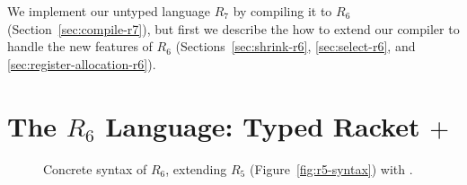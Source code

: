 \documentclass[11pt]{book}
\newcommand{\gray}[1]{{\color{gray} #1}}
\begin{document}
We implement our untyped language $R_7$ by compiling it to $R_6$
(Section~\ref{sec:compile-r7}), but first we describe the how to
extend our compiler to handle the new features of $R_6$
(Sections~\ref{sec:shrink-r6}, \ref{sec:select-r6}, and
\ref{sec:register-allocation-r6}).

\section{The $R_6$ Language: Typed Racket $+$ }
\label{sec:r6-lang}

\begin{figure}[tp]
\centering
\fbox{
\begin{minipage}{0.97\textwidth}\small
\[
\begin{array}{lcl}
  \Type &::=& \gray{\key{Integer} \mid \key{Boolean}
     \mid \LP\key{Vector}\;\Type\ldots\RP \mid \LP\key{Vectorof}\;\Type\RP \mid \key{Void}} \\
    &\mid& \gray{\LP\Type\ldots \; \key{->}\; \Type\RP} \mid \key{Any} \\
  \FType &::=& \key{Integer} \mid \key{Boolean} \mid \key{Void} \mid \LP\key{Vectorof}\;\key{Any}\RP \mid \LP\key{Vector}\; \key{Any}\ldots\RP \\
    &\mid& \LP\key{Any}\ldots \; \key{->}\; \key{Any}\RP\\
  \itm{cmp} &::= & \key{eq?} \mid \key{<} \mid \key{<=} \mid \key{>} \mid \key{>=} \\
  \Exp &::=& \ldots 
   \mid \CINJECT{\Exp}{\FType}\RP \mid \CPROJECT{\Exp}{\FType} \\
  & \mid & \LP\key{boolean?}\;\Exp\RP \mid \LP\key{integer?}\;\Exp\RP\\
  & \mid & \LP\key{vector?}\;\Exp\RP \mid \LP\key{procedure?}\;\Exp\RP \mid \LP\key{void?}\;\Exp\RP \\
  \Def &::=& \gray{ \CDEF{\Var}{\LS\Var \key{:} \Type\RS\ldots}{\Type}{\Exp} } \\
  R_6 &::=& \gray{\Def\ldots \; \Exp}
\end{array}
\]
\end{minipage}
}
\caption{Concrete syntax of $R_6$, extending $R_5$ (Figure~\ref{fig:r5-syntax})
  with .}
\label{fig:r6-concrete-syntax}
\end{figure}
\end{document}
